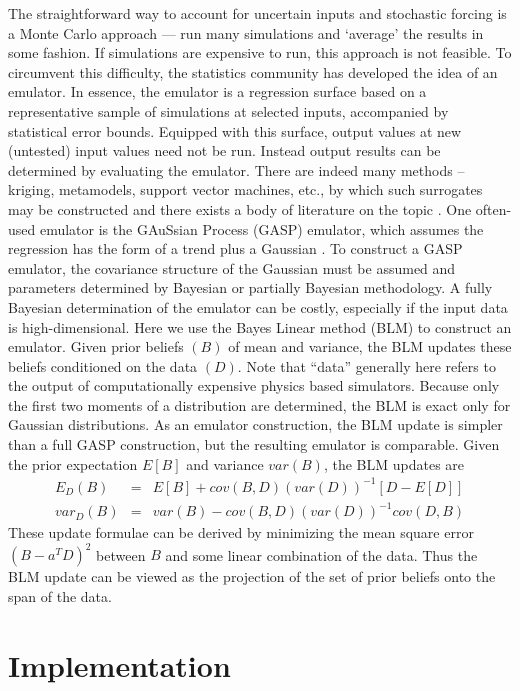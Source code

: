 \documentclass[12pt]{article}
\begin{document}
The straightforward way to account for uncertain inputs and stochastic
forcing is a Monte Carlo approach --- run many simulations and
`average' the results in some fashion. If simulations are expensive to
run, this approach is not feasible. To circumvent this difficulty, the
statistics community has developed the idea of an emulator.  In
essence, the emulator is a regression surface based on a
representative sample of simulations at selected inputs, accompanied
by statistical error bounds. Equipped with this surface, output values
at new (untested) input values need not be run.  Instead output
results can be determined by evaluating the emulator. There are indeed
many methods -- kriging, metamodels, support vector machines, etc., by
which such surrogates may be constructed and there exists a body of
literature on the topic \citep{simpson1,simpson2}.  One often-used
emulator is the GAuSsian Process (GASP) emulator, which assumes the
regression has the form of a trend plus a Gaussian
\citep{kennedy2001bcc, ContiOHagan, ohagan2006bac, bayarriusc}.  To
construct a GASP emulator, the covariance structure of the Gaussian
must be assumed and parameters determined by Bayesian or partially
Bayesian methodology.  A fully Bayesian determination of the emulator
can be costly, especially if the input data is high-dimensional.  Here
we use the Bayes Linear method (BLM) \citep{blm1tutor} to construct an
emulator. Given prior beliefs $(B)$ of mean and variance, the BLM
updates these beliefs conditioned on the data $(D)$.  Note that
``data'' generally here refers to the output of computationally
expensive physics based simulators.  Because only the first two
moments of a distribution are determined, the BLM is exact only for
Gaussian distributions.  As an emulator construction, the BLM update
is simpler than a full GASP construction, but the resulting emulator
is comparable.  Given the prior expectation $E[B]$ and variance
$var(B)$, the BLM updates are
\begin{eqnarray} \label{blupdate}
E_D(B) &=& E[B] + cov(B,D) (var(D))^{-1} [D-E[D]] \\ \nonumber
var_D(B) &=& var(B) - cov(B,D) (var(D))^{-1} cov(D,B)
\end{eqnarray}
These update formulae can be derived by minimizing the mean square
error $(B - a^T D)^2$ between $B$ and some linear combination of the
data. Thus the BLM update can be viewed as the projection of the set
of prior beliefs onto the span of the data.

\section{Implementation}
\end{document}
